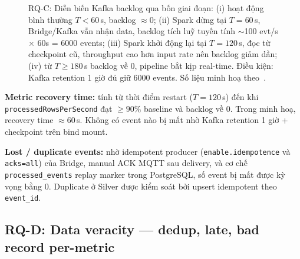 \begin{figure}[H]
\centering
{}
\caption[RQ-C: Diễn biến Kafka backlog qua bốn giai đoạn khi dừng và khởi động lại Spark.]{RQ-C: Diễn biến Kafka backlog qua bốn giai đoạn: (i) hoạt động bình
thường $T < 60$\,s, backlog $\approx 0$; (ii) Spark dừng tại $T = 60$\,s,
Bridge/Kafka vẫn nhận data, backlog tích luỹ tuyến tính $\sim$100 evt/s
$\times$ 60s = 6000 events; (iii) Spark khởi động lại tại $T = 120$\,s, đọc
từ checkpoint cũ, throughput cao hơn input rate nên backlog giảm dần; (iv) từ
$T \geq 180$\,s backlog về 0, pipeline bắt kịp real-time. Điều kiện: Kafka
retention 1 giờ đủ giữ 6000 events. Số liệu minh hoạ
theo~\cite{fault_recovery_stream_2024}.}
\label{fig:rq-c}
\end{figure}

\textbf{Metric recovery time:} tính từ thời điểm restart ($T = 120$\,s) đến
khi \texttt{processedRowsPerSecond} đạt $\geq 90\%$ baseline và backlog về 0.
Trong minh hoạ, recovery time $\approx 60$\,s. Không có event nào bị mất nhờ
Kafka retention 1 giờ + checkpoint trên bind mount.

\textbf{Lost / duplicate events:} nhờ idempotent producer (\texttt{enable.idempotence}
và \texttt{acks=all}) của Bridge, manual ACK MQTT sau delivery, và cơ chế
\texttt{processed\_events} replay marker trong PostgreSQL, số event bị mất
được kỳ vọng bằng 0. Duplicate ở Silver được kiểm soát bởi upsert idempotent
theo \texttt{event\_id}.

\subsection{RQ-D: Data veracity --- dedup, late, bad record per-metric}

